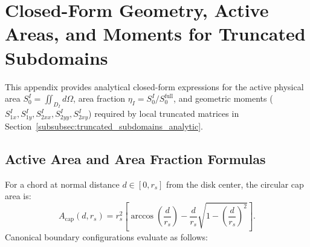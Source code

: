 \documentclass[VANCOUVER]{USG}
\begin{document}
\appendix
\section{Closed-Form Geometry, Active Areas, and Moments for Truncated Subdomains}
\label{app:truncated_geometry}

This appendix provides analytical closed-form expressions for the active physical area $S_0^I = \iint_{D_I} d\Omega$, area fraction $\eta_I = S_0^I / S_0^{\mathrm{full}}$, and geometric moments ($S_{1x}^I, S_{1y}^I, S_{2xx}^I, S_{2yy}^I, S_{2xy}^I$) required by local truncated matrices in Section~\ref{subsubsec:truncated_subdomains_analytic}.

\subsection{Active Area and Area Fraction Formulas}
For a chord at normal distance $d \in [0, r_s]$ from the disk center, the circular cap area is:
\begin{equation}
    A_{\mathrm{cap}}(d, r_s) = r_s^2 \left[ \arccos\left(\frac{d}{r_s}\right) - \frac{d}{r_s} \sqrt{1 - \left(\frac{d}{r_s}\right)^2} \right].
    \label{eq:cap_area_formula}
\end{equation}
Canonical boundary configurations evaluate as follows:
\end{document}
